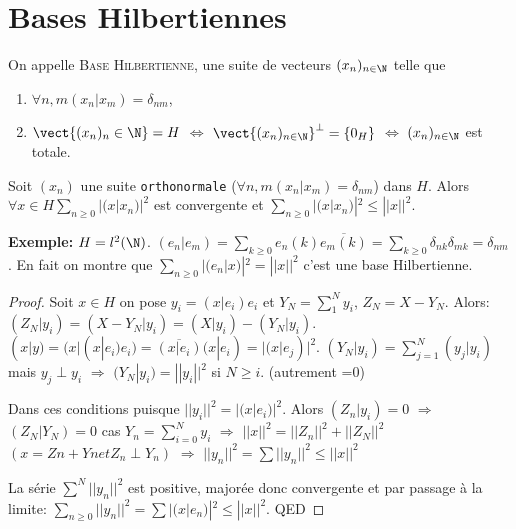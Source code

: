 \section{Bases Hilbertiennes} %

\begin{definition}
	On appelle \textsc{Base Hilbertienne}, une suite de vecteurs $(x_n)_{n\in \N}$ telle que 
	\begin{enumerate}
		\item $\forall n, m (x_n|x_m)=δ_{nm}$,
		\item $\vect\{(x_n)_n\in\N\}=H$ $\Leftrightarrow$ $\vect{(x_n)_{n\in \N}}^\perp=\{0_H\}$ $\Leftrightarrow$ $(x_n)_{n\in \N}$ est totale.
	\end{enumerate}
\end{definition}

\begin{theorem}
	Soit $(x_n)$ une suite \texttt{orthonormale} ($\forall n, m (x_n|x_m)=δ_{nm}$) dans $H$. Alors $\forall x\in H ∑_{n≥0}|(x|x_n)|^2$ est convergente et $∑_{n≥0}|(x|x_n)|^2≤||x||^2$.
\end{theorem}

\textbf{Exemple:} $H=l^2(\N)$. $(e_n|e_m)=∑_{k≥0}e_n(k)\overline{e_m(k)}=∑_{k≥0}δ_{nk}δ_{mk}=δ_{nm}$. En fait on montre que $∑_{n≥0}|(e_n|x)|^2=||x||^2$ c'est une base Hilbertienne.
\begin{proof}
	Soit $x\in H$ on pose $y_i=(x|e_i)e_i$ et $Y_N=∑_1^Ny_i$, $Z_N=X-Y_N$. Alors: $(Z_N|y_i)=(X-Y_N|y_i)=(X|y_i)-(Y_N|y_i)$. $(x|y)=(x|(x|e_i)e_i)=\overline{(x|e_i)}(x|e_i)=|(x|e_j)|^2$. $(Y_N|y_i)=∑_{j=1}^N(y_j|y_i)$ mais $y_j\perp y_i$ $\Rightarrow$  $(Y_N|y_i) =||y_i||^2$ si $N≥i$.
	(autrement =0)

Dans ces conditions puisque $||y_i||^2=|(x|e_i)|^2$. Alors $(Z_n|y_i)=0$ $\Rightarrow$  $(Z_N|Y_N)=0$ cas $Y_n=∑_{i=0}^Ny_i$ $\Rightarrow$  $||x||^2=||Z_n||^2+||Z_N||^2$ $(x=Zn+Yn et Z_n\perp Y_n)$
$\Rightarrow$  $||y_n||^2=∑||y_n||^2≤||x||^2$

La série $∑^N||y_n||^2$ est positive, majorée donc convergente et par passage à la limite: $∑_{n≥0}||y_n||^2=∑|(x|e_n)|^2≤||x||^2$. QED

\end{proof}


